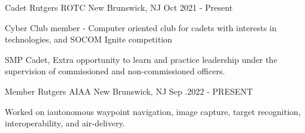 

\begin{cventries}

  \cventry
    {Cadet} %
    {Rutgers ROTC} %
    {New Brunswick,  NJ} %
    {Oct 2021 - Present} %
    {
      \begin{cvitems} %
        \item {Cyber Club member - Computer oriented club for cadets with interests in technologies, and SOCOM Ignite competition}
        \item {SMP Cadet,  Extra opportunity to learn and practice leadership under the supervision of commissioned and non-commissioned officers.}
      \end{cvitems}
    }

  \cventry
    {Member} %
    {Rutgers AIAA} %
    {New Brunswick,  NJ} %
    {Sep .2022 - PRESENT} %
    {
      \begin{cvitems} %
        \item {Worked on iautonomous waypoint navigation,  image capture,  target recognition,  interoperability,  and air-delivery.}
      \end{cvitems}
    }

\end{cventries}
